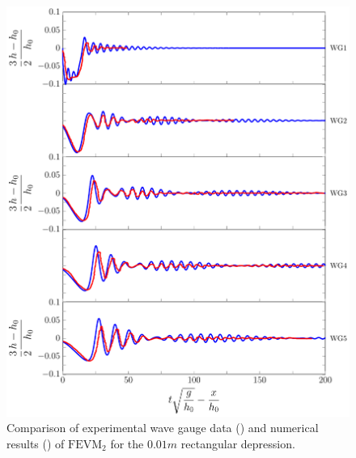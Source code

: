 \begin{figure}
	\centering
	\includegraphics[width=\textwidth]{./chp6/figures/Experiment/Segur/LongWGsFEVM1cm.pdf}
	\caption{Comparison of experimental wave gauge data ({\color{red}\solidrule}) and numerical results ({\color{blue}\solidrule}) of $\text{FEVM}_2$ for the $0.01m$ rectangular depression.}
	\label{fig:Segur1cmFEVM}
\end{figure}
